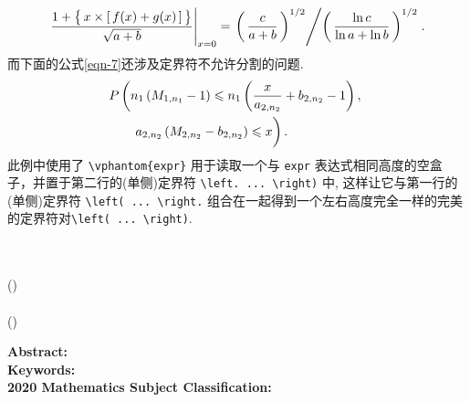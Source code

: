 \documentclass[Chinese]{APSart}
\begin{document}
\begin{enumerate}[leftmargin=7.8mm,itemsep=-0.1ex, label=(\arabic*)]
\begin{equation}\label{eqn-6}
\left.\frac{1+\bigl\{\,x\times[\,f(x)+g(x)\,]\,\bigr\}}{\sqrt{a+b}} \right|_{x=0} 
=\left.\left(\,\frac{c}{a+b}\,\right)^{1/2}\middle/ \left(\,\frac{\ln c}{\ln a+ \ln b}\,\right)^{1/2}\right..
\end{equation}
而下面的公式\eqref{eqn-7}还涉及定界符不允许分割的问题. 
\begin{align}
	P&\left(n_{1}\left(M_{1, n_{1}}-1\right) \leq n_{1}\left(\frac{x}{a_{2, n_{2}}}+b_{2, n_{2}}-1\right),\right.\nonumber\\
	&\quad\left. \vphantom{\left(\frac{x}{a_{2, n_{2}}}+b_{2, n_{2}}-1\right)}
	a_{2, n_{2}}\left(M_{2, n_{2}}-b_{2, n_{2}}\right) \leq x\right) .\label{eqn-7}
\end{align}
此例中使用了 \verb/\vphantom{expr}/ 用于读取一个与 \texttt{expr} 表达式相同高度的空盒子，并置于第二行的(单侧)定界符 \verb/\left. .../\  \verb/\right)/ 中, 这样让它与第一行的(单侧)定界符 \verb/\left( ... \right./ 组合在一起得到一个左右高度完全一样的完美的定界符对\verb/\left( ... \right)/. 
\end{enumerate}




\nocite{*}



\begin{spacing}{1.0} %
	\printbibliography[keyword={cn},resetnumbers=true,
	                   title={\bfseries\sffamily \zihao{-4}参考文献}]
\end{spacing}	

\nolinenumbers
\vspace{6mm}\hspace{-8mm}
\parbox{\textwidth}{
\begin{center}
	\\[1em]
	\textrm{\enfirstauthor}\\[0.2em]
	(\enfirstinst)\\[0.8em]
	\textrm{\ensecondauthor}\\[0.2em]
	(\ensecondinst)
\end{center}
\textbf{Abstract:}\quad\enabstract\\
\textbf{Keywords:}\quad\enkeywords\\
\textbf{2020 Mathematics Subject Classification:}\quad\amsno}
%
% 

\clearpage
\end{document}
